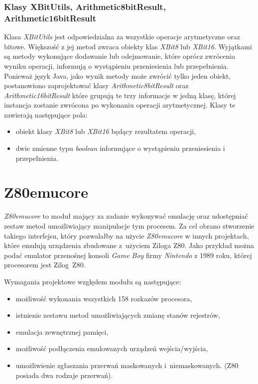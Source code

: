 	\subsubsection{Klasy XBitUtils, Arithmetic8bitResult, Arithmetic16bitResult}
	Klasa \emph{XBitUtils} jest odpowiedzialna za wszystkie operacje arytmetyczne oraz bitowe. Większość z jej metod zwraca obiekty klas \emph{XBit8} lub \emph{XBit16}. Wyjątkami są metody wykonujące dodawanie lub odejmowanie, które oprócz zwrócenia wyniku operacji, informują o wystąpieniu przeniesienia lub przepełnienia. Ponieważ język Java, jako wynik metody może zwrócić tylko jeden obiekt, postanowiono zaprojektować klasy \emph{Arithmetic8bitResult} oraz \emph{Arithmetic16bitResult} które grupują te trzy informacje w jedną klasę, której instancja zostanie zwrócona po wykonaniu operacji arytmetycznej. Klasy te zawierają następujące pola:
	\begin{itemize}
		\item obiekt klasy \emph{XBit8} lub \emph{XBit16} będący rezultatem operacji,
		\item dwie zmienne typu \emph{boolean} informujące o wystąpieniu przeniesienia i przepełnienia.
	\end{itemize}
	
	\section{Z80emu{\dywiz}core} \label{project:z80EmuCore}
	\emph{Z80emu{\dywiz}core} to moduł mający za zadanie wykonywać emulację oraz udostępniać zestaw metod umożliwiający manipulacje tym procesem. Za cel obrano stworzenie takiego interfejsu, który pozwalałby na użycie \emph{Z80emu{\dywiz}core} w innych projektach, które emulują urządzenia zbudowane z~użyciem Ziloga Z80. Jako przykład można podać emulator przenośnej konsoli \emph{Game Boy} firmy \emph{Nintendo} z 1989 roku, której procesorem jest Zilog~Z80. 

	Wymagania projektowe względem modułu są następujące:
	\begin{itemize}  
		\item możliwość wykonania wszystkich 158 rozkazów procesora,
		\item istnienie zestawu metod umożliwiających zmianę stanów rejestrów,
		\item emulacja zewnętrznej pamięci,
		\item możliwość podłączenia emulowanych urządzeń wejścia/wyjścia,
		\item umożliwienie zgłaszania przerwań maskowanych i~niemaskowanych. (Z80 posiada dwa rodzaje przerwań).
	\end{itemize}
	
